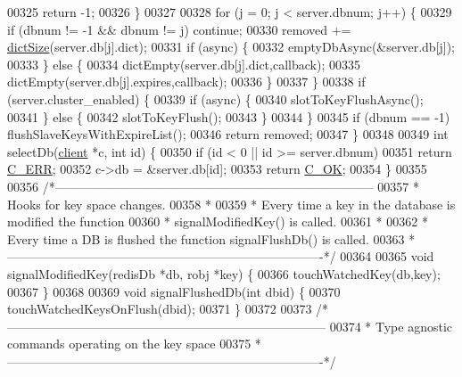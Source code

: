 \begin{DoxyCode}
00325         \textcolor{keywordflow}{return} -1;
00326     \}
00327 
00328     \textcolor{keywordflow}{for} (j = 0; j < server.dbnum; j++) \{
00329         \textcolor{keywordflow}{if} (dbnum != -1 && dbnum != j) \textcolor{keywordflow}{continue};
00330         removed += \hyperlink{dict_8h_af193430dd3d5579a52b194512f72c1f0}{dictSize}(server.db[j].dict);
00331         \textcolor{keywordflow}{if} (async) \{
00332             emptyDbAsync(&server.db[j]);
00333         \} \textcolor{keywordflow}{else} \{
00334             dictEmpty(server.db[j].dict,callback);
00335             dictEmpty(server.db[j].expires,callback);
00336         \}
00337     \}
00338     \textcolor{keywordflow}{if} (server.cluster\_enabled) \{
00339         \textcolor{keywordflow}{if} (async) \{
00340             slotToKeyFlushAsync();
00341         \} \textcolor{keywordflow}{else} \{
00342             slotToKeyFlush();
00343         \}
00344     \}
00345     \textcolor{keywordflow}{if} (dbnum == -1) flushSlaveKeysWithExpireList();
00346     \textcolor{keywordflow}{return} removed;
00347 \}
00348 
00349 \textcolor{keywordtype}{int} selectDb(\hyperlink{structclient}{client} *c, \textcolor{keywordtype}{int} id) \{
00350     \textcolor{keywordflow}{if} (id < 0 || id >= server.dbnum)
00351         \textcolor{keywordflow}{return} \hyperlink{server_8h_af98ac28d5f4d23d7ed5985188e6fb7d1}{C\_ERR};
00352     c->db = &server.db[id];
00353     \textcolor{keywordflow}{return} \hyperlink{server_8h_a303769ef1065076e68731584e758d3e1}{C\_OK};
00354 \}
00355 
00356 \textcolor{comment}{/*-----------------------------------------------------------------------------}
00357 \textcolor{comment}{ * Hooks for key space changes.}
00358 \textcolor{comment}{ *}
00359 \textcolor{comment}{ * Every time a key in the database is modified the function}
00360 \textcolor{comment}{ * signalModifiedKey() is called.}
00361 \textcolor{comment}{ *}
00362 \textcolor{comment}{ * Every time a DB is flushed the function signalFlushDb() is called.}
00363 \textcolor{comment}{ *----------------------------------------------------------------------------*/}
00364 
00365 \textcolor{keywordtype}{void} signalModifiedKey(redisDb *db, robj *key) \{
00366     touchWatchedKey(db,key);
00367 \}
00368 
00369 \textcolor{keywordtype}{void} signalFlushedDb(\textcolor{keywordtype}{int} dbid) \{
00370     touchWatchedKeysOnFlush(dbid);
00371 \}
00372 
00373 \textcolor{comment}{/*-----------------------------------------------------------------------------}
00374 \textcolor{comment}{ * Type agnostic commands operating on the key space}
00375 \textcolor{comment}{ *----------------------------------------------------------------------------*/}

\end{DoxyCode}
